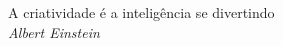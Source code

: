 \pretextualchapter{}
\vfill
\begin{flushright}
	A criatividade é a inteligência se divertindo\\
	\textit{Albert Einstein}
\end{flushright}








